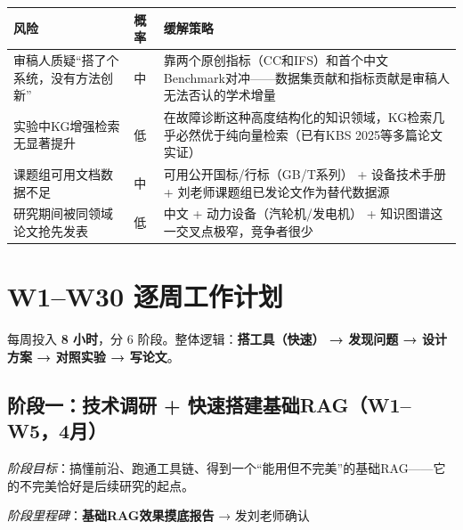\documentclass[a4paper, 11pt]{ctexart}
\begin{document}
\begin{table}[H]
\centering
\renewcommand{\arraystretch}{1.3}
\small
\begin{tabular}{p{4.5cm} p{1.5cm} p{7cm}}
    \toprule
    \textbf{风险} & \textbf{概率} & \textbf{缓解策略} \\
    \midrule
    审稿人质疑``搭了个系统，没有方法创新'' & 中 & 靠两个原创指标（CC和IFS）和首个中文Benchmark对冲——数据集贡献和指标贡献是审稿人无法否认的学术增量 \\
    实验中KG增强检索无显著提升 & 低 & 在故障诊断这种高度结构化的知识领域，KG检索几乎必然优于纯向量检索（已有KBS 2025等多篇论文实证） \\
    课题组可用文档数据不足 & 中 & 可用公开国标/行标（GB/T系列） + 设备技术手册 + 刘老师课题组已发论文作为替代数据源 \\
    研究期间被同领域论文抢先发表 & 低 & 中文 + 动力设备（汽轮机/发电机） + 知识图谱这一交叉点极窄，竞争者很少 \\
    \bottomrule
\end{tabular}
\end{table}


\section{W1--W30 逐周工作计划}

每周投入 \textbf{8 小时}，分 6 阶段。整体逻辑：\textbf{搭工具（快速） → 发现问题 → 设计方案 → 对照实验 → 写论文}。

\subsection{阶段一：技术调研 + 快速搭建基础RAG（W1--W5，4月）}

\noindent\textit{阶段目标}：搞懂前沿、跑通工具链、得到一个``能用但不完美''的基础RAG——它的不完美恰好是后续研究的起点。

\noindent\textit{阶段里程碑}：{\color{tsinghua}\textbf{基础RAG效果摸底报告} → 发刘老师确认}
\end{document}
